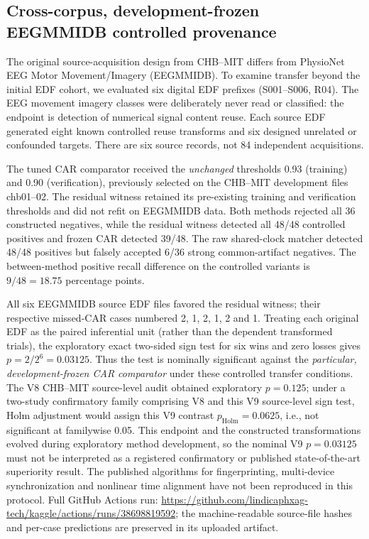 \subsection{Cross-corpus, development-frozen EEGMMIDB controlled provenance}
The original source-acquisition design from CHB--MIT differs from
PhysioNet EEG Motor Movement/Imagery (EEGMMIDB).
To examine transfer beyond the initial EDF cohort, we evaluated
six digital EDF prefixes (S001--S006, R04). The EEG movement
imagery classes were deliberately never read or classified:
the endpoint is detection of numerical signal content reuse.
Each source EDF generated eight known controlled reuse
transforms and six designed unrelated or confounded targets.
There are six source records, not 84 independent acquisitions.

The tuned CAR comparator received the \emph{unchanged} thresholds
0.93 (training) and 0.90 (verification), previously selected
on the CHB--MIT development files chb01--02. The residual
witness retained its pre-existing training and verification
thresholds and did not refit on EEGMMIDB data.
Both methods rejected all 36 constructed negatives, while
the residual witness detected all 48/48 controlled
positives and frozen CAR detected 39/48. The raw
shared-clock matcher detected 48/48 positives but
falsely accepted 6/36 strong common-artifact negatives.
The between-method positive recall difference on the
controlled variants is $9/48=18.75$ percentage points.

All six EEGMMIDB source EDF files favored the residual
witness; their respective missed-CAR cases numbered
2, 1, 2, 1, 2 and 1. Treating each original EDF as
the paired inferential unit (rather than the dependent
transformed trials), the exploratory exact two-sided
sign test for six wins and zero losses gives
$p=2/2^6=0.03125$. Thus the test is nominally
significant against the \emph{particular, development-frozen
CAR comparator} under these controlled transfer conditions.
The V8 CHB--MIT source-level audit obtained exploratory
$p=0.125$; under a two-study confirmatory family
comprising V8 and this V9 source-level sign test,
Holm adjustment would assign this V9 contrast
$p_{\mathrm{Holm}}=0.0625$, i.e., not significant
at familywise 0.05. This endpoint and the constructed
transformations evolved during exploratory method
development, so the nominal V9 $p=0.03125$ must not
be interpreted as a registered confirmatory or
published state-of-the-art superiority result. The published algorithms for fingerprinting,
multi-device synchronization and nonlinear time alignment
have not been reproduced in this protocol.
Full GitHub Actions run:
\url{https://github.com/lindicaphxag-tech/kaggle/actions/runs/38698819592};
the machine-readable source-file hashes and per-case
predictions are preserved in its uploaded artifact.

